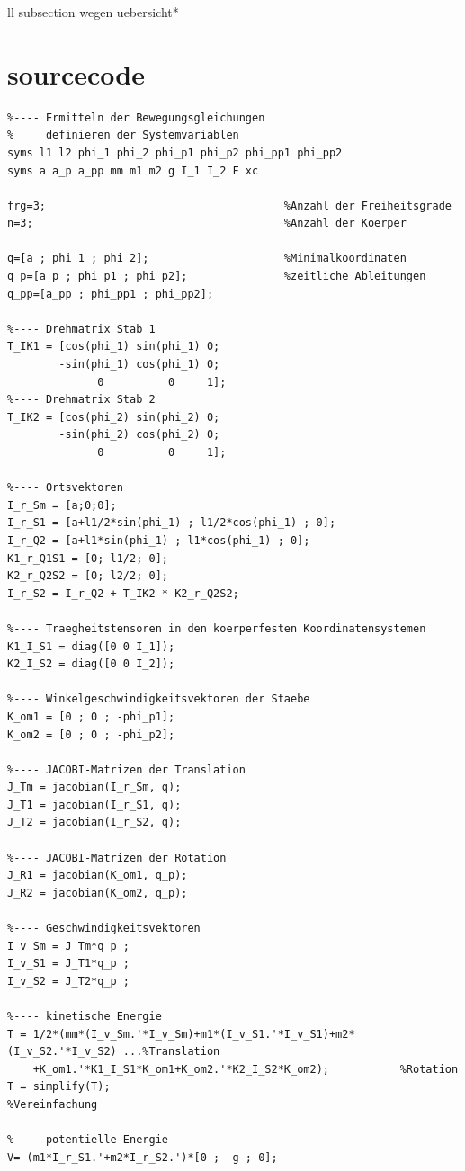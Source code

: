 \documentclass[a4paper, 10pt]{report}
\begin{document}
ll subsection wegen uebersicht*
%
\section{sourcecode}

\begin{lstlisting}
%---- Ermitteln der Bewegungsgleichungen
%     definieren der Systemvariablen
syms l1 l2 phi_1 phi_2 phi_p1 phi_p2 phi_pp1 phi_pp2
syms a a_p a_pp mm m1 m2 g I_1 I_2 F xc

frg=3;                                     %Anzahl der Freiheitsgrade
n=3;                                       %Anzahl der Koerper

q=[a ; phi_1 ; phi_2];                     %Minimalkoordinaten
q_p=[a_p ; phi_p1 ; phi_p2];               %zeitliche Ableitungen
q_pp=[a_pp ; phi_pp1 ; phi_pp2];

%---- Drehmatrix Stab 1
T_IK1 = [cos(phi_1) sin(phi_1) 0;
        -sin(phi_1) cos(phi_1) 0;
              0          0     1];
%---- Drehmatrix Stab 2
T_IK2 = [cos(phi_2) sin(phi_2) 0;
        -sin(phi_2) cos(phi_2) 0;
              0          0     1];

%---- Ortsvektoren
I_r_Sm = [a;0;0];
I_r_S1 = [a+l1/2*sin(phi_1) ; l1/2*cos(phi_1) ; 0];
I_r_Q2 = [a+l1*sin(phi_1) ; l1*cos(phi_1) ; 0];
K1_r_Q1S1 = [0; l1/2; 0];
K2_r_Q2S2 = [0; l2/2; 0];
I_r_S2 = I_r_Q2 + T_IK2 * K2_r_Q2S2;

%---- Traegheitstensoren in den koerperfesten Koordinatensystemen
K1_I_S1 = diag([0 0 I_1]);
K2_I_S2 = diag([0 0 I_2]);

%---- Winkelgeschwindigkeitsvektoren der Staebe
K_om1 = [0 ; 0 ; -phi_p1];
K_om2 = [0 ; 0 ; -phi_p2];

%---- JACOBI-Matrizen der Translation
J_Tm = jacobian(I_r_Sm, q);
J_T1 = jacobian(I_r_S1, q);
J_T2 = jacobian(I_r_S2, q);

%---- JACOBI-Matrizen der Rotation
J_R1 = jacobian(K_om1, q_p);
J_R2 = jacobian(K_om2, q_p);

%---- Geschwindigkeitsvektoren
I_v_Sm = J_Tm*q_p ;
I_v_S1 = J_T1*q_p ; 
I_v_S2 = J_T2*q_p ;

%---- kinetische Energie
T = 1/2*(mm*(I_v_Sm.'*I_v_Sm)+m1*(I_v_S1.'*I_v_S1)+m2*(I_v_S2.'*I_v_S2) ...%Translation
    +K_om1.'*K1_I_S1*K_om1+K_om2.'*K2_I_S2*K_om2);           %Rotation
T = simplify(T);                                             %Vereinfachung

%---- potentielle Energie
V=-(m1*I_r_S1.'+m2*I_r_S2.')*[0 ; -g ; 0];


\end{lstlisting}
\end{document}
